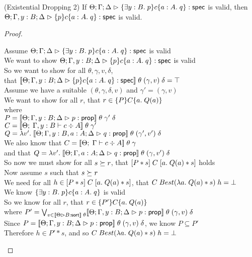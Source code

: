 \begin{lemma}{(Existential Dropping 2)}
If $\judgeS{\spec{\exists y:B.\;p}{c}{a:A}{q}}$ is valid, then 
   $\judgeS[\Theta; \Gamma, y:B; \Delta]{\spec{p}{c}{a:A}{q}}$ is valid. 
\end{lemma}

\begin{proof}
  \begin{tabbedproof}
    \oo Assume $\judgeS{\spec{\exists y:B.\;p}{c}{a:A}{q}}$ is valid \\
    \ooo We want to show $\judgeS[\Theta; \Gamma, y:B; \Delta]{\spec{p}{c}{a:A}{q}}$ is valid \\
    \ooo So we want to show for all $\theta, \gamma, v, \delta$, \\
    \ooox that $\interp{\judgeS[\Theta; \Gamma, y:B; \Delta]{\spec{p}{c}{a:A}{q}}}\;\theta\;(\gamma,v)\;\delta = \top$ \\
    \ooo Assume we have a suitable $(\theta, \gamma, \delta, v)$ and $\gamma' = (\gamma, v)$\\ 
    \oooo We want to show for all $r$, that $r \in \spec{P}{C}{a}{Q(a)}$ \\
    \oooo where \\
    \oooox $P = \interp{\judgeA[\Theta; \Gamma, y:B; \Delta]{p}{\assert}}\;\theta\;\gamma'\;\delta$ \\
    \oooox $C = \interp{\judgeC[\Theta]{\Gamma, y:B}{c}{A}}\;\theta\;\gamma'$ \\
    \oooox $Q = \semfun{v'}{\interp{\judgeA[\Theta; \Gamma, y:B, a:A; \Delta]{q}{\assert}}\;\theta\;(\gamma', v')\;\delta}$ \\
    \oooo We also know that $C = \interp{\judgeC[\Theta]{\Gamma}{c}{A}}\;\theta\;\gamma$ \\
    \oooo and that $Q = \semfun{v'}{\interp{\judgeA[\Theta;\Gamma, a:A;\Delta]{q}{\assert}}\;\theta\;(\gamma, v')\;\delta}$\\
    \oooo So now we must show for all $s \worldgeq r$, that $\basicspec{P * s}{C}{a}{Q(a) * s}$ holds\\
    \oooo Now assume $s$ such that $s \worldgeq r$ \\
    \ooooo We need for all $h \in \basicspec{P * s}{C}{a}{Q(a) * s}$, that 
             $C\;Best(\semfun{a}{Q(a) * s})\;h = \bot$ \\
    \ooooo We know $\spec{\exists y:B.\;p}{c}{a:A}{q}$ is valid \\
    \ooooo So we know for all $r$, that $r \in \spec{P'}{C}{a}{Q(a)}$ \\
    \oooox where $P' = \bigvee_{v \in \interp{\judgeSort{B}}\;\theta} \interp{\judgeA[\Theta; \Gamma, y:B; \Delta]{p}{\assert}}\;\theta\;(\gamma, v)\;\delta$ \\
    \ooooo Since $P = \interp{\judgeA[\Theta; \Gamma, y:B; \Delta]{p}{\assert}}\;\theta\;(\gamma, v)\;\delta$, we know $P \subseteq P'$ \\
    \ooooo Therefore $h \in P' * s$, and so $C\;Best(\semfun{a}{Q(a) * s})\;h = \bot$ \\
    
  \end{tabbedproof}
\end{proof}

